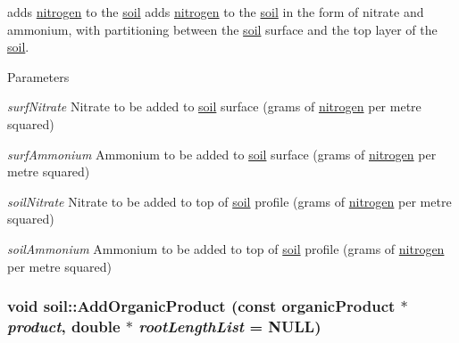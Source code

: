 adds \hyperlink{classnitrogen}{nitrogen} to the \hyperlink{classsoil}{soil} adds \hyperlink{classnitrogen}{nitrogen} to the \hyperlink{classsoil}{soil} in the form of nitrate and ammonium, with partitioning between the \hyperlink{classsoil}{soil} surface and the top layer of the \hyperlink{classsoil}{soil}. 
\begin{DoxyParams}{Parameters}
\item[{\em surfNitrate}]Nitrate to be added to \hyperlink{classsoil}{soil} surface (grams of \hyperlink{classnitrogen}{nitrogen} per metre squared) \item[{\em surfAmmonium}]Ammonium to be added to \hyperlink{classsoil}{soil} surface (grams of \hyperlink{classnitrogen}{nitrogen} per metre squared) \item[{\em soilNitrate}]Nitrate to be added to top of \hyperlink{classsoil}{soil} profile (grams of \hyperlink{classnitrogen}{nitrogen} per metre squared) \item[{\em soilAmmonium}]Ammonium to be added to top of \hyperlink{classsoil}{soil} profile (grams of \hyperlink{classnitrogen}{nitrogen} per metre squared) \end{DoxyParams}
\hypertarget{classsoil_afdc5aef4b05a7077fc613127df6341e7}{
\subsubsection[{AddOrganicProduct}]{\setlength{\rightskip}{0pt plus 5cm}void soil::AddOrganicProduct (const {\bf organicProduct} $\ast$ {\em product}, \/  double $\ast$ {\em rootLengthList} = {\ttfamily NULL})}}
\label{classsoil_afdc5aef4b05a7077fc613127df6341e7}


